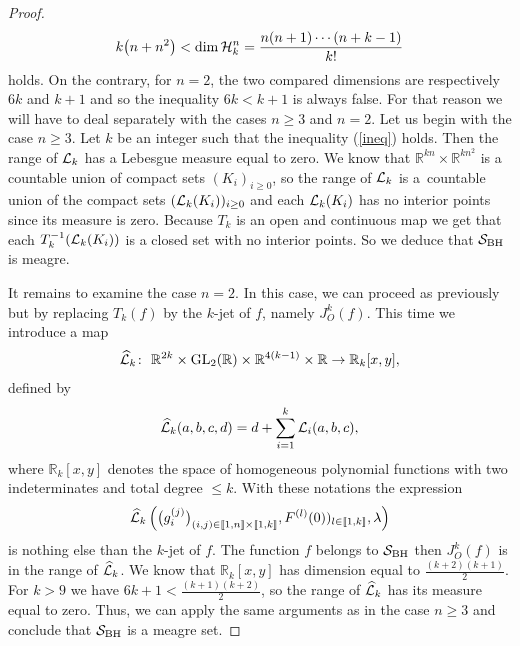\documentclass[10pt,a4paper]{amsart}
\numberwithin{equation}{section}
\begin{document}
\begin{proof}
	\begin{gather}\label{ineq}
	k\big(n+n^2\big)<\operatorname{dim}{\cal H}_k^n=\frac{n(n+1)\cdots(n+k-1)}{k!}
	\end{gather}
	holds.
	On the contrary, for $n=2$, the two compared dimensions are respectively $6k$ and $k+1$ and so the inequality $6k<k+1$ is always false. For that reason we will have to deal separately with the cases $n\geq 3$ and $n=2$.
	Let us begin with the case $n\geq 3$.
	Let $k$ be an integer such that the inequality (\ref{ineq}) holds. Then the range of ${\cal L}_k$ has a Lebesgue measure equal to zero. We know that $\mathbb{R}^{kn}\times\mathbb{R}^{kn^2}$ is a countable union of compact sets $(K_i)_{i\geq0}$, so the range of ${\cal L}_k$ is a~countable union of the compact sets $({\cal L}_k(K_i))_{i\geq0}$ and each ${\cal L}_k(K_i)$ has no interior points since its measure is zero. Because $T_k$ is an open and continuous map we get that each $T_k^{-1}({\cal L}_k(K_i))$ is a closed set with no interior points. So we deduce that ${\cal S}_{\rm BH}$ is meagre.
	
	It remains to examine the case $n=2$. In this case, we can proceed as previously but by replacing $T_k(f)$ by the $k$-jet of $f$, namely $J^k_O(f)$. This time we introduce a map
\begin{gather*}
\widehat{\cal L}_k\colon\ \mathbb{R}^{2k}\times {\rm GL}_2(\mathbb{R})\times\mathbb{R}^{4(k-1)}\times\mathbb{R}\to\mathbb{R}_k[x,y],
\end{gather*}
	defined by
\begin{gather*}
\widehat{\cal L}_k(a,b,c,d)=d+\sum_{i=1}^{k}{\cal L}_i(a,b,c),
\end{gather*}
	where $\mathbb{R}_k[x,y]$ denotes the space of homogeneous polynomial functions with two indeterminates and total degree $\leq k$.
	With these notations the expression
\begin{gather*}
\widehat{\cal L}_k\left(\big(g_i^{(j)}\big)_{(i,j)\in[\![1,n]\!]\times[\![1,k]\!]},F^{(l)}(0))_{l\in[\![1,k]\!]},\lambda\right)
\end{gather*}
	is nothing else than the $k$-jet of $f$. The function $f$ belongs to ${\cal S}_{\rm BH}$ then $J^k_O(f)$ is in the range of $\widehat{\cal L}_k$.
	We know that $\mathbb{R}_k[x,y]$ has dimension equal to $\frac{(k+2)(k+1)}{2}$. For $k>9$ we have $6k+1<\frac{(k+1)(k+2)}{2}$, so the range of $\widehat{\cal L}_k$ has its measure equal to zero. Thus, we can apply the same arguments as in the case $n\geq3$ and conclude that ${\cal S}_{\rm BH}$ is a meagre set.
\end{proof}
\end{document}
